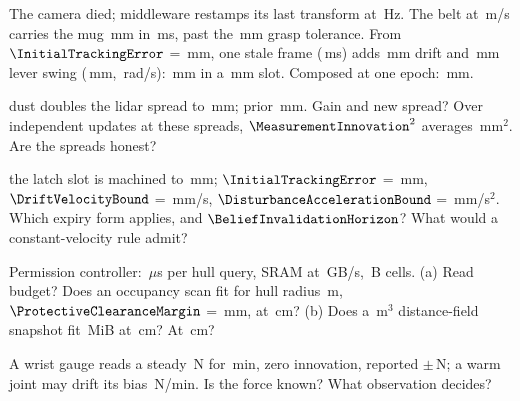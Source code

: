 \documentclass{studysheet}
\begin{document}
\begin{rightcol}
%
  {The camera died; middleware restamps its last transform at \,Hz. The belt at \,m/s
   carries the mug \,mm in \,ms, past the \,mm grasp tolerance.}{}
%
  {From $\InitialTrackingError$ = \,mm, one stale frame (\,ms) adds \,mm drift and \,mm lever
   swing (\,mm, \,rad/s): \,mm in a \,mm slot. Composed at one epoch: \,mm.}{}

\vspace{2pt}
\begin{qs}
\item \assumed{} dust doubles the lidar spread to \,mm; prior \,mm.
  Gain and new spread? Over  independent updates at these spreads, $\MeasurementInnovation^2$ averages \,mm$^2$. Are the spreads honest?
\item \assumed{} the latch slot is machined to \,mm; $\InitialTrackingError$ = \,mm,
  $\DriftVelocityBound$ = \,mm/s, $\DisturbanceAccelerationBound$ = \,mm/s$^2$. Which expiry form
  applies, and $\BeliefInvalidationHorizon$? What would a constant-velocity rule admit?
\item Permission controller: \,$\mu$s per hull query, SRAM at \,GB/s,
  \,B cells. (a) Read budget? Does an occupancy scan fit for hull radius \,m,
  $\ProtectiveClearanceMargin$ = \,mm, at \,cm? (b) Does a \,m$^3$ distance-field
  snapshot fit \,MiB at \,cm? At \,cm?
\item A wrist gauge reads a steady \,N for \,min, zero innovation, reported
  $\pm$\,N; a warm joint may drift its bias \,N/min. Is the force known? What observation decides?
\end{qs}
\end{rightcol}
\end{document}
